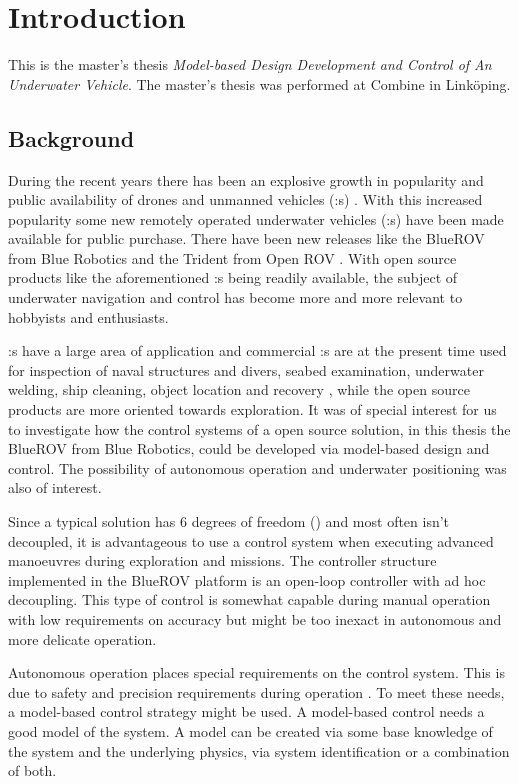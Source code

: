 \chapter{Introduction}\label{cha:intro}
This is the master's thesis \textit{Model-based Design Development and Control of An Underwater Vehicle}.
The master's thesis was performed at Combine in Linköping.

\section{Background}
During the recent years there has been an explosive growth in popularity and public availability of drones and unmanned vehicles (\abbrUV:s) \citep{popmechanics}. With this increased popularity some new remotely operated underwater vehicles (\abbrROV:s) have been made available for public purchase. There have been new releases like the BlueROV from Blue Robotics \citep{bluerobotics} and the Trident from Open ROV \citep{openrov}. With open source products like the aforementioned \abbrROV:s being readily available, the subject of underwater navigation and control has become more and more relevant to hobbyists and enthusiasts.

\abbrROV:s have a large area of application and commercial \abbrROV:s are at the present time used for inspection of naval structures and divers, seabed examination, underwater welding, ship cleaning, object location and recovery \citep{saab}, while the open source products are more oriented towards exploration. It was of special interest for us to investigate how the control systems of a open source \abbrROV solution, in this thesis the BlueROV from Blue Robotics, could be developed via model-based design and control. The possibility of autonomous operation and underwater positioning was also of interest.

Since a typical \abbrROV solution has 6 degrees of freedom (\abbrDOF) and most often isn't decoupled, it is advantageous to use a control system when executing advanced manoeuvres during exploration and missions. The controller structure implemented in the BlueROV platform is an open-loop controller with ad hoc decoupling. This type of control is somewhat capable during manual operation with low requirements on accuracy but might be too inexact in autonomous and more delicate operation. 

Autonomous operation places special requirements on the control system. This is due to safety and precision requirements during operation \citep[p.416-417]{safety}. To meet these needs, a model-based control strategy might be used. A model-based control needs a good model of the system. A model can be created via some base knowledge of the system and the underlying physics, via system identification or a combination of both. 

